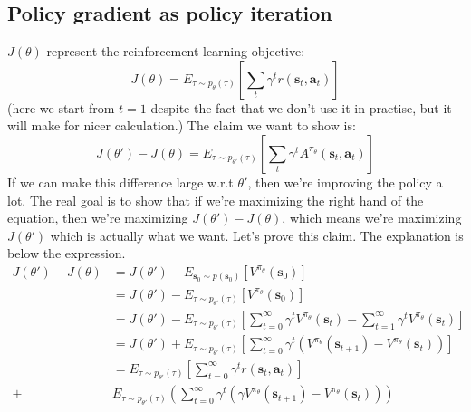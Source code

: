\documentclass{report}
\begin{document}
\subsection{Policy gradient as policy iteration}
$ J (\theta)  $ represent the reinforcement learning objective:
\begin{equation}
		J (\theta) = E_{ \tau \sim p_{ \theta }(\tau )} \left[ \sum_{t}^{} \gamma^{ t } r (\bm{s}_{t}, \bm{a}_{t} ) \right] 
\end{equation}
(here we start from $t=1$ despite the fact that we don't use it in practise, but it will make for nicer calculation.)
The claim we want to show is:
\begin{equation}
J (\theta') - J (\theta) =  
E_{ \tau \sim p_{ \theta' } (\tau) } \left[ \sum_{t}^{} \gamma^{ t } A^{ \pi_{ \theta } } (\bm{s}_{t}, \bm{a}_{t} ) \right] 
\end{equation}
If we can make this difference large w.r.t $ \theta'  $, then we're improving the policy a lot.
The real goal is to show that if we're maximizing the right hand of the equation,
then we're maximizing $J (\theta') - J (\theta)$, which means we're maximizing $ J (\theta')  $
which is actually what we want.
Let's prove this claim.
The explanation is below the expression.
\begin{align}
		J (\theta') - J (\theta) &= 
J (\theta') - E_{ \bm{s}_{0} \sim p (\bm{s}_{0}) } \left[ V^{ \pi_{ \theta } } (\bm{s}_{0}) \right] \\
&= 
J (\theta') - E_{ \tau \sim p_{ \theta' } (\tau) } \left[ V^{ \pi_{ \theta } } (\bm{s}_{0}) \right] \\
&= 
J (\theta') - E_{ \tau \sim p_{ \theta' } (\tau) } \left[
\sum_{t=0}^{\infty} \gamma^{ t } V^{ \pi_{ \theta } } (\bm{s}_{t}) - \sum_{t=1}^{\infty} \gamma^{ t } V^{ \pi_{ \theta } } (\bm{s}_{t})
\right] \\
&= 
J (\theta') + E_{ \tau \sim p_{ \theta' } (\tau) } \left[
\sum_{t=0}^{\infty} \gamma^{ t } \left(    V^{ \pi_{ \theta } } (\bm{s}_{t+1}) - V^{ \pi_{ \theta } } (\bm{s}_{t}) \right)
\right] \\
&=
E_{ \tau \sim p_{ \theta' } (\tau) } \left[ \sum_{t=0}^{\infty} \gamma^{ t } r (\bm{s}_{t}, \bm{a}_{t} ) \right] 
 \nonumber \\
		+&
 E_{ \tau \sim p_{ \theta' } (\tau) } 
\left( \sum_{t=0}^{\infty} \gamma^{ t } \left( \gamma V^{ \pi_{ \theta } } (\bm{s}_{t+1}) - V^{ \pi_{ \theta } } (\bm{s}_{t}) \right)  \right)  
\end{align}
\end{document}
